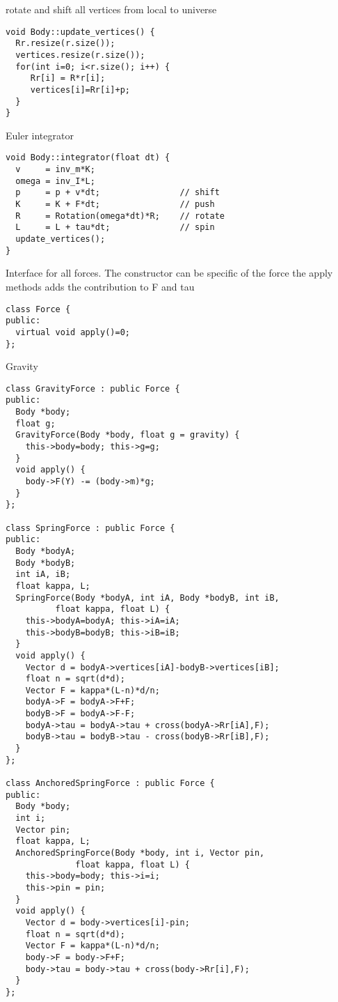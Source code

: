rotate and shift all vertices from local to universe
\begin{lstlisting}
void Body::update_vertices() {
  Rr.resize(r.size());
  vertices.resize(r.size());
  for(int i=0; i<r.size(); i++) {
     Rr[i] = R*r[i];
     vertices[i]=Rr[i]+p;
  }
}
\end{lstlisting}

Euler integrator
\begin{lstlisting}
void Body::integrator(float dt) {
  v     = inv_m*K;
  omega = inv_I*L;
  p     = p + v*dt;                // shift
  K     = K + F*dt;                // push
  R     = Rotation(omega*dt)*R;    // rotate
  L     = L + tau*dt;              // spin
  update_vertices();
}
\end{lstlisting}

Interface for all forces.
The constructor can be specific of the force
the apply methods adds the contribution to F and tau
\begin{lstlisting}
class Force {
public:
  virtual void apply()=0;
};
\end{lstlisting}

Gravity
\begin{lstlisting}
class GravityForce : public Force {
public:  
  Body *body;
  float g;
  GravityForce(Body *body, float g = gravity) {
    this->body=body; this->g=g;    
  }
  void apply() {
    body->F(Y) -= (body->m)*g;
  }
};

class SpringForce : public Force {
public:
  Body *bodyA;
  Body *bodyB;
  int iA, iB;
  float kappa, L;
  SpringForce(Body *bodyA, int iA, Body *bodyB, int iB,
	      float kappa, float L) {
    this->bodyA=bodyA; this->iA=iA;
    this->bodyB=bodyB; this->iB=iB;
  }
  void apply() {
    Vector d = bodyA->vertices[iA]-bodyB->vertices[iB];
    float n = sqrt(d*d);
    Vector F = kappa*(L-n)*d/n;
    bodyA->F = bodyA->F+F;
    bodyB->F = bodyA->F-F;
    bodyA->tau = bodyA->tau + cross(bodyA->Rr[iA],F);
    bodyB->tau = bodyB->tau - cross(bodyB->Rr[iB],F);
  }
};

class AnchoredSpringForce : public Force {
public:
  Body *body;
  int i;
  Vector pin;
  float kappa, L;
  AnchoredSpringForce(Body *body, int i, Vector pin,
		      float kappa, float L) {
    this->body=body; this->i=i;
    this->pin = pin;
  }
  void apply() {
    Vector d = body->vertices[i]-pin;
    float n = sqrt(d*d);
    Vector F = kappa*(L-n)*d/n;
    body->F = body->F+F;
    body->tau = body->tau + cross(body->Rr[i],F);
  }
};
\end{lstlisting}

